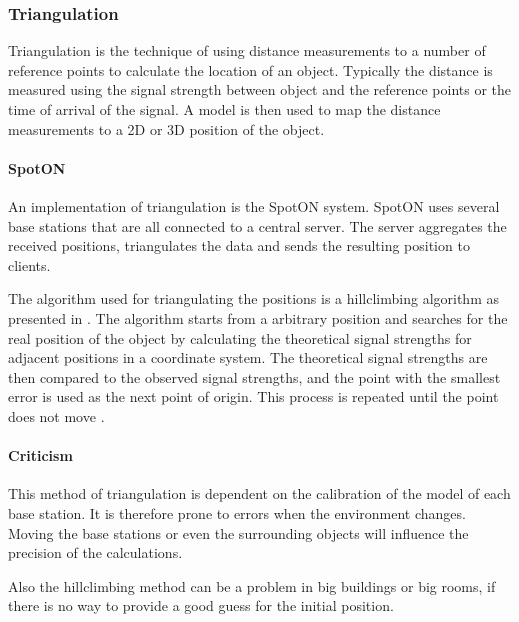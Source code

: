 \subsubsection{Triangulation}\label{triangulation}
Triangulation is the technique of using distance measurements to a number of reference points to calculate the location of an object.
Typically the distance is measured using the signal strength between object and the reference points or the time of arrival of the signal.
A model is then used to map the distance measurements to a 2D or 3D position of the object.\cite[Section 4.1]{rfidreview}

\paragraph{SpotON}
An implementation of triangulation is the SpotON system\cite{spoton}.
SpotON uses several base stations that are all connected to a central server.
The server aggregates the received positions, triangulates the data and sends the resulting position to clients. \cite{spoton}

The algorithm used for triangulating the positions is a hillclimbing algorithm as presented in \citet[Section 3.3.1]{spoton}.
The algorithm starts from a arbitrary position and searches for the real position of the object by calculating the theoretical signal strengths for adjacent positions in a coordinate system.
The theoretical signal strengths are then compared to the observed signal strengths, and the point with the smallest error is used as the next point of origin.
This process is repeated until the point does not move \cite{spoton}.

\paragraph{Criticism}
This method of triangulation is dependent on the calibration of the model of each base station.
It is therefore prone to errors when the environment changes.
Moving the base stations or even the surrounding objects will influence the precision of the calculations.

Also the hillclimbing method can be a problem in big buildings or big rooms, if there is no way to provide a good guess for the initial position.

